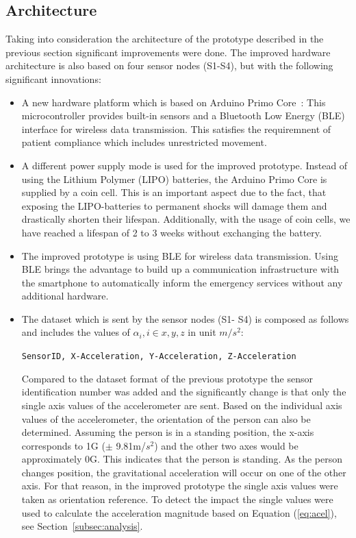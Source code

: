 \documentclass[review]{elsarticle}
\begin{document}
\subsection{Architecture}
\label{sub:improvedprototypearchitecture}

Taking into consideration the architecture of the prototype described in the previous 
section significant improvements were done. The improved hardware architecture is also 
based on four sensor nodes (S1-S4), but with the following significant innovations:

\begin{itemize}
 \item A new hardware platform which is based on Arduino Primo Core~\cite{Arduino2018}: 
 This microcontroller provides built-in sensors and a Bluetooth Low Energy (BLE) 
 interface for wireless data transmission. This satisfies the
 requiremnent of patient compliance
 which includes unrestricted movement.
 \item A different power supply mode is used for the improved prototype. Instead of 
 using the Lithium Polymer (LIPO) batteries, the Arduino Primo Core is supplied by a 
 coin cell. This is an important aspect due to the fact, that exposing the LIPO-batteries 
 to permanent shocks will damage them and drastically shorten their lifespan. 
 Additionally, with the usage of coin cells, we have reached a lifespan of 2 to 3 weeks 
 without exchanging the battery.
 \item The improved prototype is using BLE for wireless data transmission. Using BLE 
 brings the advantage to build up a communication infrastructure with the smartphone 
 to automatically inform the emergency services without any additional hardware.
 \item The dataset which is sent by the sensor nodes (S1- S4) is composed as follows 
 and includes the values of $\alpha_{i}, i \in {x,y,z}$ in unit $m/s^{2}$:
 \begin{center}
  \texttt{SensorID, X-Acceleration, Y-Acceleration, Z-Acceleration}
 \end{center}
 Compared to the dataset format of the previous prototype the sensor identification 
 number was added and the significantly change is that only the single axis values of 
 the accelerometer are sent. Based on the individual axis values of the accelerometer, 
 the orientation of the person can also be determined. Assuming the person is in a standing 
 position, the x-axis corresponds to 1G ($\pm$ 9.81m/$s^2$) and the other two axes would be 
 approximately 0G. This indicates that the person is standing. As the person changes 
 position, the gravitational acceleration will occur on one of the other axis. For that 
 reason, in the improved prototype the single axis values were taken as orientation 
 reference. To detect the impact the single values were used to calculate the acceleration 
 magnitude based on Equation (\ref{eq:acel}), see Section~\ref{subsec:analysis}.
\end{itemize}
\end{document}
